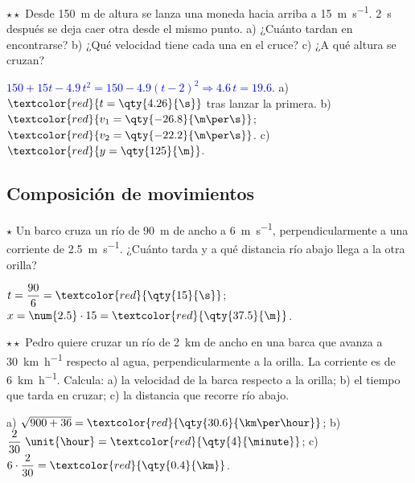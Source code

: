 \begin{exercise}
    \(\star\star\) Desde \qty{150}{\m} de altura se lanza una moneda hacia arriba a \qty{15}{\m\per\s}. \qty{2}{\s} después se deja
    caer otra desde el mismo punto. a) ¿Cuánto tardan en encontrarse? b) ¿Qué velocidad tiene cada una en el cruce? c) ¿A qué altura
    se cruzan?
    \begin{solu}
        \textcolor{blue}{\(150 + 15t - \num{4.9}\,t^2 = 150 - \num{4.9}(t - 2)^2 \Rightarrow \num{4.6}\,t = \num{19.6}\).}
        a) \(\textcolor{red}{t = \qty{4.26}{\s}}\) tras lanzar la primera. b) \(\textcolor{red}{v_1 = \qty{-26.8}{\m\per\s}}\);
        \(\textcolor{red}{v_2 = \qty{-22.2}{\m\per\s}}\). c) \(\textcolor{red}{y = \qty{125}{\m}}\).
    \end{solu}
\end{exercise}

\subsection{Composición de movimientos}

\begin{exercise}
    \(\star\) Un barco cruza un río de \qty{90}{\m} de ancho a \qty{6}{\m\per\s}, perpendicularmente a una corriente de
    \qty{2.5}{\m\per\s}. ¿Cuánto tarda y a qué distancia río abajo llega a la otra orilla?
    \begin{solu}
        \(t = \dfrac{90}{6} = \textcolor{red}{\qty{15}{\s}}\); \(x = \num{2.5} \cdot 15 = \textcolor{red}{\qty{37.5}{\m}}\).
    \end{solu}
\end{exercise}

\begin{exercise}
    \(\star\star\) Pedro quiere cruzar un río de \qty{2}{\km} de ancho en una barca que avanza a \qty{30}{\km\per\hour} respecto al
    agua, perpendicularmente a la orilla. La corriente es de \qty{6}{\km\per\hour}. Calcula: a) la velocidad de la barca respecto a la
    orilla; b) el tiempo que tarda en cruzar; c) la distancia que recorre río abajo.
    \begin{solu}
        a) \(\sqrt{900 + 36} = \textcolor{red}{\qty{30.6}{\km\per\hour}}\); b) \(\dfrac{2}{30}~\unit{\hour} = \textcolor{red}{\qty{4}{\minute}}\);
        c) \(6 \cdot \dfrac{2}{30} = \textcolor{red}{\qty{0.4}{\km}}\).
    \end{solu}
\end{exercise}


